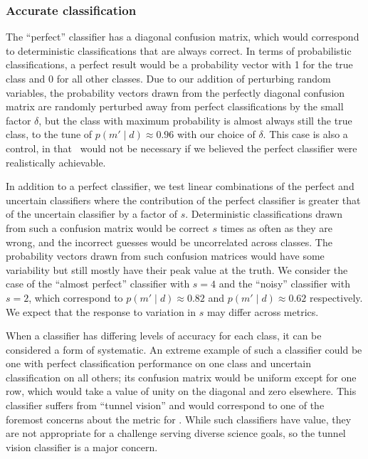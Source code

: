 \subsubsection{Accurate classification}
\label{sec:accuratedata}

The ``perfect'' classifier has a diagonal confusion matrix, which would correspond to deterministic classifications that are always correct.
In terms of probabilistic classifications, a perfect result would be a probability vector with 1 for the true class and 0 for all other classes.
Due to our addition of perturbing random variables, the probability vectors drawn from the perfectly diagonal confusion matrix are randomly perturbed away from perfect classifications by the small factor $\delta$, but the class with maximum probability is almost always still the true class, to the tune of $p(m' \mid d)\approx0.96$ with our choice of $\delta$.
This case is also a control, in that \plasticc\ would not be necessary if we believed the perfect classifier were realistically achievable.

In addition to a perfect classifier, we test linear combinations of the perfect and uncertain classifiers where the contribution of the perfect classifier is greater that of the uncertain classifier by a factor of $s$.
Deterministic classifications drawn from such a confusion matrix would be correct $s$ times as often as they are wrong, and the incorrect guesses would be uncorrelated across classes.
The probability vectors drawn from such confusion matrices would have some variability but still mostly have their peak value at the truth.
We consider the case of the ``almost perfect'' classifier with $s=4$ and the ``noisy'' classifier with $s=2$, which correspond to $p(m' \mid d)\approx0.82$ and $p(m' \mid d)\approx0.62$ respectively.
We expect that the response to variation in $s$ may differ across metrics.

When a classifier has differing levels of accuracy for each class, it can be considered a form of systematic.
An extreme example of such a classifier could be one with perfect classification performance on one class and uncertain classification on all others; its confusion matrix would be uniform except for one row, which would take a value of unity on the diagonal and zero elsewhere.
This classifier suffers from ``tunnel vision'' and would correspond to one of the foremost concerns about the metric for \plasticc.
While such classifiers have value, they are not appropriate for a challenge serving diverse science goals, so the tunnel vision classifier is a major concern.

